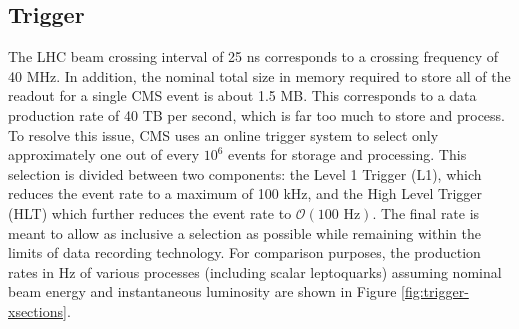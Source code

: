 \subsection{Trigger}
\label {sec:trigger}

The LHC beam crossing interval of 25 ns corresponds to a crossing
frequency of 40 MHz.  In addition, the nominal total size in memory required
to store all of the readout for a single CMS event is about 1.5 MB.
This corresponds to a data production rate of 40 TB per second, which is far 
too much to store and process.  To resolve this issue, CMS uses an online trigger
system to select only approximately one out of every $10^6$ events for storage
and processing.  This selection is divided between two components:
the Level 1 Trigger (L1), 
which reduces the event rate to a maximum of 100 kHz,
and the High Level Trigger (HLT)
which further reduces the event rate to $\mathcal{O}(100\text{ Hz})$.
The final rate is meant to allow as inclusive a selection as possible while remaining 
within the limits of data recording technology.
For comparison purposes, the production rates in Hz of various processes (including scalar leptoquarks) 
assuming nominal beam energy and instantaneous luminosity
are shown in Figure \ref{fig:trigger-xsections}.

